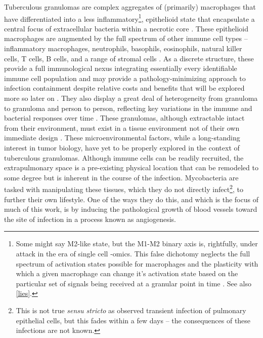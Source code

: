 Tuberculous granulomas are complex aggregates of (primarily) macrophages that have differentiated into a less inflammatory\footnote{Some might say M2\hyp{}like state, but the M1\hyp{}M2 binary axis is, rightfully, under attack in the era of single cell \hyp{}omics. This false dichotomy neglects the full spectrum of activation states possible for macrophages and the plasticity with which a given macrophage can change it's activation state based on the particular set of signals being received at a granular point in time \citep{Martinez2014, Ley2017}. See also \autoref{lies}.}, epithelioid state that encapsulate a central focus of extracellular bacteria within a necrotic core \citep{Boros2003, Rubin2009, Cronan2016}. These epithelioid macrophages are augmented by the full spectrum of other immune cell types -- inflammatory macrophages, neutrophils, basophils, eosinophils, natural killer cells, T cells, B cells, and a range of stromal cells \citep{Russell2007, Ramakrishnan2012}. As a discrete structure, these provide a full immunological nexus integrating essentially every identifiable immune cell population and may provide a pathology\hyp{}minimizing approach to infection containment despite relative costs and benefits that will be explored more so later on \citep{Casadevall2003}. They also display a great deal of heterogeneity from granuloma to granuloma and person to person, reflecting key variations in the immune and bacterial responses over time \citep{Cadena2017, Gideon2022}. These granulomas, although extractable intact from their environment, must exist in a tissue environment not of their own immediate design \citep{Datta2015, Kaplan2003, McCaffrey2022, Cronan2018}. These microenvironmental factors, while a long\hyp{}standing interest in tumor biology, have yet to be properly explored in the context of tuberculous granulomas. Although immune cells can be readily recruited, the extrapulmonary space is a pre\hyp{}existing physical location that can be remodeled to some degree but is inherent in the course of the infection. Mycobacteria are tasked with manipulating these tissues, which they do not directly infect\footnote{This is not true \textit{sensu stricto} as \citet{Cohen2018} observed transient infection of pulmonary epithelial cells, but this fades within a few days -- the consequences of these infections are not known.}, to further their own lifestyle. One of the ways they do this, and which is the focus of much of this work, is by inducing the pathological growth of blood vessels toward the site of infection in a process known as angiogenesis.

